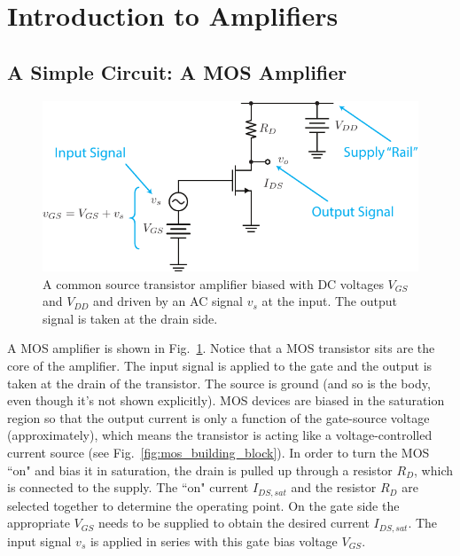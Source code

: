\section{Introduction to Amplifiers}



\subsection{A Simple Circuit: A MOS Amplifier}

\begin{figure}[tb]
\begin{center}
\includegraphics[width=.75\columnwidth]{csamp_signals}
\end{center}
\caption{A common source transistor amplifier biased with DC voltages $V_{GS}$ and $V_{DD}$ and driven by an AC signal $v_s$ at the input.  The output signal is taken at the drain side. } \label{fig:csamp_signals}
\end{figure}

A MOS amplifier is shown in Fig.~\ref{fig:csamp_signals}.  Notice that a MOS transistor sits are the core of the amplifier.  The input signal is applied to the gate and the output is taken at the drain of the transistor.  The source is ground (and so is the body, even though it's not shown explicitly).  MOS devices are biased in the saturation region so that the output current is only a function of the gate-source voltage (approximately), which means the transistor is acting like a voltage-controlled current source (see Fig.~\ref{fig:mos_building_block}).  In order to turn the MOS ``on" and bias it in saturation, the drain is pulled up through a resistor $R_D$, which is connected to the supply.  The ``on" current $I_{DS,sat}$ and the resistor $R_D$ are selected together to determine the operating point.  On the gate side the appropriate $V_{GS}$ needs to be supplied to obtain the desired current $I_{DS,sat}$.  The input signal $v_{s}$ is applied in series with this gate bias  voltage $V_{GS}$.  

